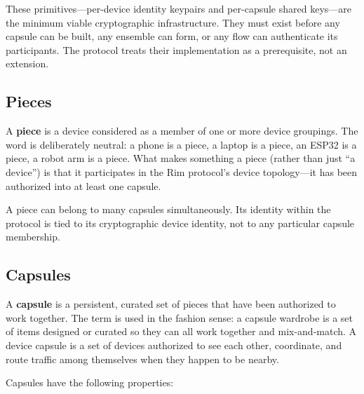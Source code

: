 \documentclass[11pt, letterpaper]{article}
\begin{document}
These primitives---per-device identity keypairs and per-capsule shared keys---are the
minimum viable cryptographic infrastructure. They must exist before any capsule can be
built, any ensemble can form, or any flow can authenticate its participants. The
protocol treats their implementation as a prerequisite, not an extension.

\subsection{Pieces}

A \textbf{piece} is a device considered as a member of one or more device groupings. The
word is deliberately neutral: a phone is a piece, a laptop is a piece, an ESP32 is a
piece, a robot arm is a piece. What makes something a piece (rather than just ``a
device'') is that it participates in the Rim protocol's device topology---it has been
authorized into at least one capsule.

A piece can belong to many capsules simultaneously. Its identity within the protocol is
tied to its cryptographic device identity, not to any particular capsule membership.

\subsection{Capsules}

A \textbf{capsule} is a persistent, curated set of pieces that have been authorized to
work together. The term is used in the fashion sense: a capsule wardrobe is a set of
items designed or curated so they can all work together and mix-and-match. A device
capsule is a set of devices authorized to see each other, coordinate, and route traffic
among themselves when they happen to be nearby.

Capsules have the following properties:
\end{document}
